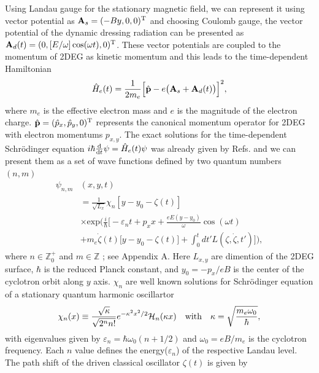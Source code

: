 Using Landau gauge for the stationary magnetic field, we can represent it using vector potential as $\vb{A}_{s} = (-By,0,0)^{\text{T}}$ and choosing Coulomb gauge, the vector potential of the dynamic dressing radiation can be presented as $\vb{A}_{d}(t) = (0,[E/\omega ]\cos(\omega t),0)^{\text{T}}$. These vector potentials are coupled to the momentum of 2DEG as kinetic momentum \cite{mahan00,bruus04} and this leads to the time-dependent Hamiltonian
\begin{equation} \label{eq_1}
  \hat{H}_e(t) = \frac{1}{2m_e}\Big[\hat{\vb{p}} - e\big(\vb{A}_{s}+\vb{A}_{d}(t)\big)\Big]^2,
\end{equation}
where $m_e$ is the effective electron mass and $e$ is the magnitude of the electron charge. $\hat{\vb{p}} = (\hat{p}_x,\hat{p}_y,0)^{\text{T}}$ represents the canonical momentum operator for 2DEG with electron momentums $p_{x,y}$.
The exact solutions for the time-dependent Schrödinger equation $i\hbar \dv{t}\psi = \hat{H}_e(t) \psi$ was already given by Refs. \cite{husmi53,ditt98,dini16} and we can present them as a set of wave functions defined by two quantum numbers $(n,m)$
\begin{equation} \label{eq_2}
  \begin{aligned}
    \psi_{n,m}&(x,y,t)  \\
    & = \frac{1}{\sqrt{L_x}}
    \chi_n\left[y - y_0 - \zeta(t)\right]\\
    & \times
    \text{exp}\bigg(
    \frac{i}{\hbar}\bigg[- \varepsilon_nt
    + p_x x + \frac{eE(y - y_0)}{\omega}\cos(\omega t)\\
    &+
    m_e\dot{\zeta}(t)\big[y - y_0 -\zeta(t)\big] +
    \int_0^{t}dt'L(\zeta,\dot{\zeta},t')\bigg]\bigg),
  \end{aligned}
\end{equation}
where $n \in \mathbb{Z}^{+}_0$ and $m \in \mathbb{Z}$ ; see Appendix A. Here $L_{x,y}$ are dimention of the 2DEG surface, $\hbar$ is the reduced Planck constant, and $y_0 = -p_x/eB$ is the center of the cyclotron orbit along $y$ axis. $\chi_n$ are well known solutions for Schrödinger equation of a stationary quantum harmonic oscillartor
\begin{equation} \label{eq_3}
  \chi_n(x) \equiv
   \frac{\sqrt{\kappa}}{\sqrt{2^{n}n!}}
  e^{-\kappa^2 x^2/2}
  \mathcal{H}_n \qty(\kappa x) \quad \text{with}
  \quad
  \kappa = \sqrt{\frac{m_e \omega_0}{\hbar}},
\end{equation}
with eigenvalues given by $\varepsilon_n = \hbar \omega_0 (n + 1/2)$ and $\omega_0 = eB/m_e$ is the cyclotron frequency. Each $n$ value defines the  energy($\varepsilon_n$) of the respective Landau level. The path shift of the driven classical oscillator $\zeta(t)$ is given by
